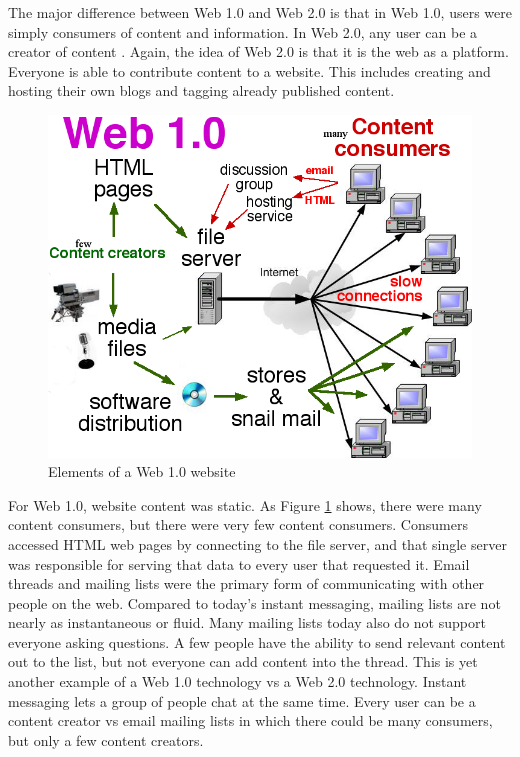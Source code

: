 \documentclass[12pt]{article}
\begin{document}
The major difference between Web 1.0 and Web 2.0 is that in Web 1.0, users were simply consumers of content and information.  In Web 2.0, any user can be a creator of content \cite{FM2125}.  Again, the idea of Web 2.0 is that it is the web as a platform.  Everyone is able to contribute content to a website.  This includes creating and hosting their own blogs and tagging already published content.

\begin{figure}[H]
  \begin{center}
    \includegraphics[scale=0.4]{Web_1.0_elements.png}
    \caption{Elements of a Web 1.0 website}
    \label{fig:web1elements}
  \end{center}
\end{figure}

For Web 1.0, website content was static.  As Figure \ref{fig:web1elements} shows, there were many content consumers, but there were very few content consumers.  Consumers accessed HTML web pages by connecting to the file server, and that single server was responsible for serving that data to every user that requested it.  Email threads and mailing lists were the primary form of communicating with other people on the web.  Compared to today's instant messaging, mailing lists are not nearly as instantaneous or fluid.  Many mailing lists today also do not support everyone asking questions.  A few people have the ability to send relevant content out to the list, but not everyone can add content into the thread.  This is yet another example of a Web 1.0 technology vs a Web 2.0 technology.  Instant messaging lets a group of people chat at the same time.  Every user can be a content creator vs email mailing lists in which there could be many consumers, but only a few content creators.
\end{document}
